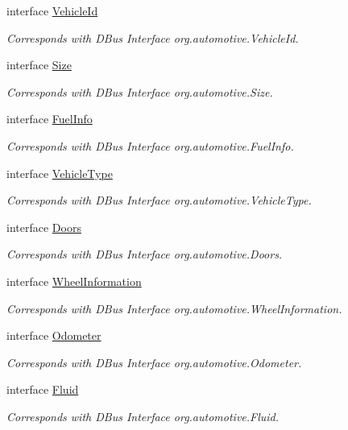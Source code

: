\begin{DoxyCompactItemize}
interface \hyperlink{interfaceVehicleId}{Vehicle\+Id}
\begin{DoxyCompactList}\small\item\em Corresponds with D\+Bus Interface org.\+automotive.\+Vehicle\+Id. \end{DoxyCompactList}\item 
interface \hyperlink{interfaceSize}{Size}
\begin{DoxyCompactList}\small\item\em Corresponds with D\+Bus Interface org.\+automotive.\+Size. \end{DoxyCompactList}\item 
interface \hyperlink{interfaceFuelInfo}{Fuel\+Info}
\begin{DoxyCompactList}\small\item\em Corresponds with D\+Bus Interface org.\+automotive.\+Fuel\+Info. \end{DoxyCompactList}\item 
interface \hyperlink{interfaceVehicleType}{Vehicle\+Type}
\begin{DoxyCompactList}\small\item\em Corresponds with D\+Bus Interface org.\+automotive.\+Vehicle\+Type. \end{DoxyCompactList}\item 
interface \hyperlink{interfaceDoors}{Doors}
\begin{DoxyCompactList}\small\item\em Corresponds with D\+Bus Interface org.\+automotive.\+Doors. \end{DoxyCompactList}\item 
interface \hyperlink{interfaceWheelInformation}{Wheel\+Information}
\begin{DoxyCompactList}\small\item\em Corresponds with D\+Bus Interface org.\+automotive.\+Wheel\+Information. \end{DoxyCompactList}\item 
interface \hyperlink{interfaceOdometer}{Odometer}
\begin{DoxyCompactList}\small\item\em Corresponds with D\+Bus Interface org.\+automotive.\+Odometer. \end{DoxyCompactList}\item 
interface \hyperlink{interfaceFluid}{Fluid}
\begin{DoxyCompactList}\small\item\em Corresponds with D\+Bus Interface org.\+automotive.\+Fluid. \end{DoxyCompactList}\item 

\end{DoxyCompactItemize}
